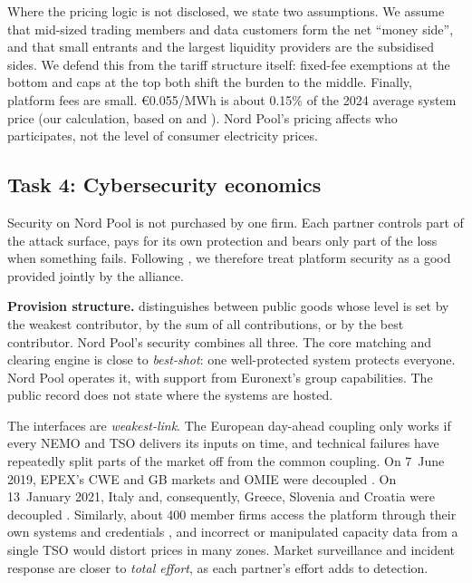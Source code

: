 Where the pricing logic is not disclosed, we state two assumptions. We assume that mid-sized trading members and data customers form the net ``money side'', and that small entrants and the largest liquidity providers are the subsidised sides. We defend this from the tariff structure itself: fixed-fee exemptions at the bottom and caps at the top both shift the burden to the middle. Finally, platform fees are small. €0.055/MWh is about 0.15\% of the 2024 average system price (our calculation, based on \citealp{NPFees2026} and \citealp{NP2024}). Nord Pool's pricing affects who participates, not the level of consumer electricity prices.

\subsection{Task 4: Cybersecurity economics}
\label{sec:t4}

Security on Nord Pool is not purchased by one firm. Each partner controls part of the attack surface, pays for its own protection and bears only part of the loss when something fails. Following \citet{Kianpour2022}, we therefore treat platform security as a good provided jointly by the alliance.

\textbf{Provision structure.} \citet{Hirshleifer1983} distinguishes between public goods whose level is set by the weakest contributor, by the sum of all contributions, or by the best contributor. Nord Pool's security combines all three. The core matching and clearing engine is close to \emph{best-shot}: one well-protected system protects everyone. Nord Pool operates it, with support from Euronext's group capabilities. The public record does not state where the systems are hosted.

The interfaces are \emph{weakest-link}. The European day-ahead coupling only works if every NEMO and TSO delivers its inputs on time, and technical failures have repeatedly split parts of the market off from the common coupling. On 7~June 2019, EPEX's CWE and GB markets and OMIE were decoupled \citep{NPIncident2019}. On 13~January 2021, Italy and, consequently, Greece, Slovenia and Croatia were decoupled \citep{SDAC2021}. Similarly, about 400 member firms access the platform through their own systems and credentials \citep{NP2024}, and incorrect or manipulated capacity data from a single TSO would distort prices in many zones. Market surveillance and incident response are closer to \emph{total effort}, as each partner's effort adds to detection.

